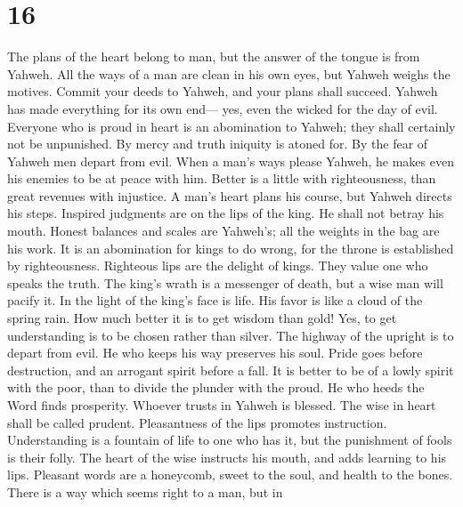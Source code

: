 \hypertarget{section-15}{%
\section{16}\label{section-15}}

 The plans of the heart belong to man, but the answer of the
tongue is from Yahweh.  All the ways of a man are clean in
his own eyes, but Yahweh weighs the motives.  Commit your
deeds to Yahweh, and your plans shall succeed.  Yahweh has
made everything for its own end--- yes, even the wicked for the day of
evil.  Everyone who is proud in heart is an abomination to
Yahweh; they shall certainly not be unpunished.  By mercy
and truth iniquity is atoned for. By the fear of Yahweh men depart from
evil.  When a man's ways please Yahweh, he makes even his
enemies to be at peace with him.  Better is a little with
righteousness, than great revenues with injustice.  A man's
heart plans his course, but Yahweh directs his steps. 
Inspired judgments are on the lips of the king. He shall not betray his
mouth.  Honest balances and scales are Yahweh's; all the
weights in the bag are his work.  It is an abomination for
kings to do wrong, for the throne is established by righteousness.
 Righteous lips are the delight of kings. They value one
who speaks the truth.  The king's wrath is a messenger of
death, but a wise man will pacify it.  In the light of the
king's face is life. His favor is like a cloud of the spring rain.
 How much better it is to get wisdom than gold! Yes, to get
understanding is to be chosen rather than silver.  The
highway of the upright is to depart from evil. He who keeps his way
preserves his soul.  Pride goes before destruction, and an
arrogant spirit before a fall.  It is better to be of a
lowly spirit with the poor, than to divide the plunder with the proud.
 He who heeds the Word finds prosperity. Whoever trusts in
Yahweh is blessed.  The wise in heart shall be called
prudent. Pleasantness of the lips promotes instruction. 
Understanding is a fountain of life to one who has it, but the
punishment of fools is their folly.  The heart of the wise
instructs his mouth, and adds learning to his lips. 
Pleasant words are a honeycomb, sweet to the soul, and health to the
bones.  There is a way which seems right to a man, but in
